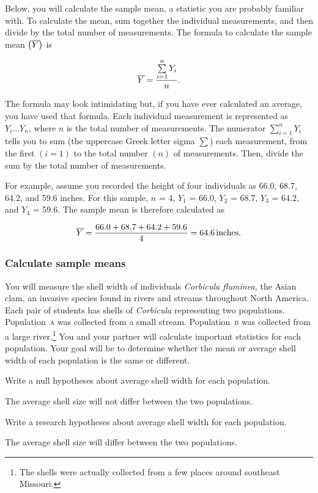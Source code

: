 \documentclass[12pt]{exam}
\newcommand*\AnswerBox[2]{%
    \parbox[t][#1]{0.92\textwidth}{%
    \begin{solution}#2\end{solution}}
}
\newcommand*\meanY{\overline{Y\kern1.67pt}\kern-1.67pt}
\newcommand*\Popa{Population~\textsc{a}}
\newcommand*\Popb{Population~\textsc{b}}
\newcommand*\Corbicula{\textit{Corbicula}}
\begin{document}
\begin{questions}
Below, you will calculate the sample mean, a statistic you are probably familiar with. 
To calculate the mean, sum together the individual measurements, and then divide by the total number
of measurements. The formula to calculate the sample mean $\left(\meanY \right)$ is

\[ \meanY = \frac{\sum\limits^n_{i=1} Y_i}{n}. \]

The formula may look intimidating but, if you have ever calculated an 
average, you have used that formula. Each individual measurement is represented as $Y_i \dots Y_n$, 
where $n$ is the total number of measurements. The numerator $\sum^n_{i=1} Y_i$ tells you to sum (the uppercase Greek letter sigma $\textstyle\sum$) each measurement, from the first 
$(i=1)$ to the total number $(n)$ of measurements. Then, divide the sum by the 
total number of measurements.

For example, assume you recorded the height of four individuals as 
66.0, 68.7, 64.2, and 59.6 inches. For this sample, $n$ = 4, $Y_1$ = 66.0, 
$Y_2$ = 68.7, $Y_3$ = 64.2, and $Y_4$ = 59.6. The sample mean is therefore calculated as

\[ \meanY = \frac{66.0 + 68.7 + 64.2 + 59.6}{4} = 64.6\,\mathrm{inches.} \]

\subsubsection*{Calculate sample means}

You will measure the shell width of individuals
\textit{Corbicula fluminea,} the Asian clam, an invasive species 
found in rivers and streams throughout North America. Each pair
of students has shells of \Corbicula{} representing two populations.
\Popa{} was collected from a small stream. \Popb{}
was collected from a large river.\footnote{The shells were actually collected from 
a few places around southeast Missouri.} You
and your partner will calculate important statistics for each population.
Your goal will be to determine whether the mean or average shell width
of each population is the same or different.

\question
Write a null hypotheses about average shell width for each population.

\AnswerBox{2\baselineskip}{The average shell size will not differ between the two populations.}

\question
Write a research hypotheses about average shell width for each population.

\AnswerBox{2\baselineskip}{The average shell size will differ between the two populations.}


\end{questions}
\end{document}
